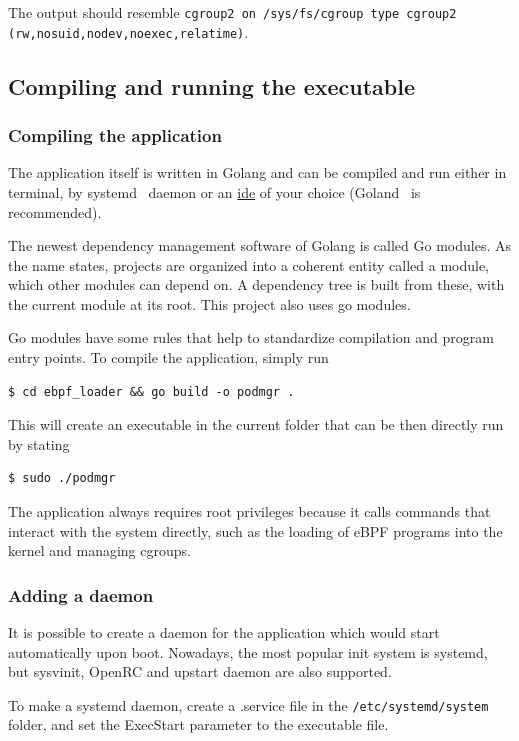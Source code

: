 The output should resemble \texttt{cgroup2 on /sys/fs/cgroup type cgroup2 (rw,nosuid,nodev,noexec,relatime)}.

\newpage
\subsection{Compiling and running the executable}
\subsubsection{Compiling the application}
The application itself is written in Golang and can be compiled and run either in terminal, by systemd~\cite{systemd} daemon or an \underline{\gls{ide}} of your choice (Goland~\cite{goland} is recommended).

The newest dependency management software of Golang is called Go modules. As the name states, projects are organized into a coherent entity called a module, which other modules can depend on. A dependency tree is built from these, with the current module at its root. This project also uses go modules.

\noindent
Go modules have some rules that help to standardize compilation and program entry points. To compile the application, simply run
\begin{verbatim}
$ cd ebpf_loader && go build -o podmgr .
\end{verbatim}

\noindent
This will create an executable in the current folder that can be then directly run by stating
\begin{verbatim}
$ sudo ./podmgr
\end{verbatim}
\noindent
The application always requires root privileges because it calls commands that interact with the system directly, such as the loading of eBPF programs into the kernel and managing cgroups.

\subsubsection{Adding a daemon}
It is possible to create a daemon for the application which would start automatically upon boot. Nowadays, the most popular init system is systemd, but sysvinit, OpenRC and upstart daemon are also supported.

To make a systemd daemon, create a .service file in the \texttt{/etc/systemd/system} folder, and set the ExecStart parameter to the executable file.

